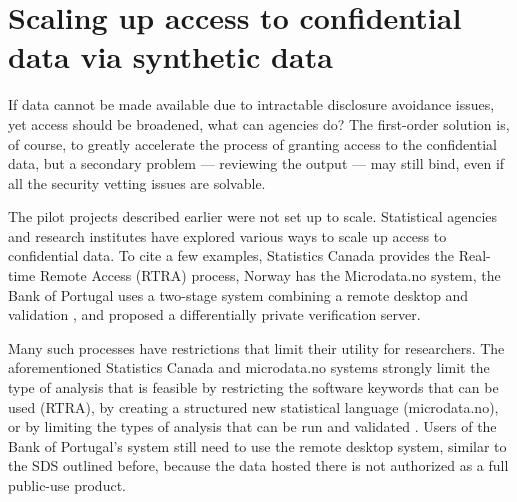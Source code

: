 \documentclass[12pt]{article}
\begin{document}
\section{Scaling up access to confidential data via synthetic data}

If data cannot be made available due to intractable disclosure avoidance issues, yet access should be broadened, what can agencies do?  The first-order solution is, of course, to greatly accelerate the process of granting access to the confidential data, but a secondary problem --- reviewing the output  --- may still bind, even if all the security vetting issues are solvable.

The pilot projects described earlier were not set up to scale. Statistical agencies and research institutes have explored various ways to scale up access to confidential data. To cite a few examples, Statistics Canada provides the Real-time Remote Access (RTRA) process, Norway has the Microdata.no system, the Bank of Portugal uses a two-stage system combining a remote desktop and validation \citep{guimaraes_reproducibility_2023}, and \citet{barrientos_providing_2018} proposed a differentially private verification server. 

Many such processes have restrictions that limit their utility for researchers. The aforementioned Statistics Canada and microdata.no systems strongly limit the type of analysis that is feasible by restricting the software keywords that can be used (RTRA), by creating a structured new statistical language (microdata.no), or by limiting the types of analysis that can be run and validated \citep{barrientos_providing_2018}. Users of the Bank of Portugal's system still need to use the remote desktop system, similar to the SDS outlined before, because the data hosted there is not authorized as a full public-use product.
\end{document}
